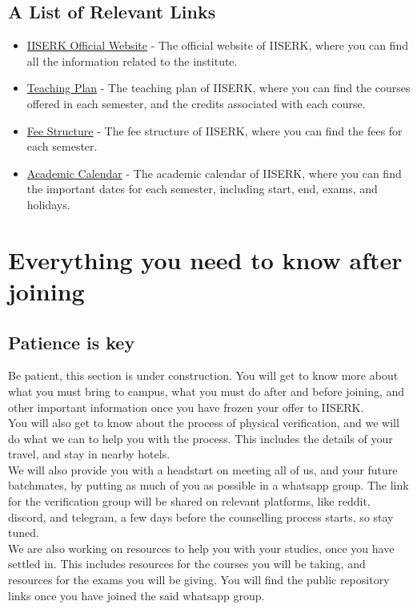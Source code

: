 \documentclass[openany]{book}
\begin{document}
\section{A List of Relevant Links}
\begin{itemize}
    \item \href{https://www.iiserkol.ac.in/}{IISERK Official Website} - The official website of IISERK, where you can find all the information related to the institute. 
    \item \href{https://www.iiserkol.ac.in/teaching-plan/}{Teaching Plan} - The teaching plan of IISERK, where you can find the courses offered in each semester, and the credits associated with each course.
    \item \href{https://www.iiserkol.ac.in/media/filer_public/d1/53/d1531bee-7eab-4c2a-896a-460bd527952d/fees_new_autumn_2025.pdf}{Fee Structure} - The fee structure of IISERK, where you can find the fees for each semester. 
    \item \href{https://www.iiserkol.ac.in/media/filer_public/5d/1c/5d1ce264-9fcd-43af-b731-6dc4f783b871/academic_calendar_autumn_2025_spring_2026.pdf}{Academic Calendar} - The academic calendar of IISERK, where you can find the important dates for each semester, including start, end, exams, and holidays. 
\end{itemize}
\chapter{Everything you need to know after joining}
\section{Patience is key}
Be patient, this section is under construction. You will get to know more about what you must bring to campus, what you must do after and before joining, and other important information once you have frozen your offer to IISERK. \\
You will also get to know about the process of physical verification, and we will do what we can to help you with the process. This includes the details of your travel, and stay in nearby hotels.  \\ 
We will also provide you with a headstart on meeting all of us, and your future batchmates, by putting as much of you as possible in a whatsapp group. The link for the verification group will be shared on relevant platforms, like reddit, discord, and telegram, a few days before the counselling process starts, so stay tuned. \\
We are also working on resources to help you with your studies, once you have settled in. This includes resources for the courses you will be taking, and resources for the exams you will be giving. You will find the public repository links once you have joined the said whatsapp group. \\
\end{document}
